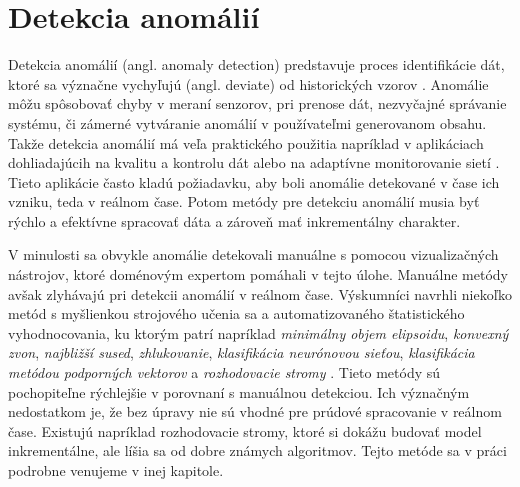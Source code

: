 \section{Detekcia anomálií}
Detekcia anomálií (angl. anomaly detection) predstavuje proces identifikácie dát, ktoré sa význačne vychyľujú (angl. deviate) od historických vzorov \citep{hodge2004survey}. Anomálie môžu spôsobovať chyby v meraní senzorov, pri prenose dát, nezvyčajné správanie systému, či zámerné vytváranie anomálií v používateľmi generovanom obsahu. 
Takže detekcia anomálií má veľa praktického použitia napríklad v aplikáciach dohliadajúcih na kvalitu a kontrolu dát \citep{hill2007real} alebo na adaptívne monitorovanie sietí \citep{hill2010anomaly}. Tieto aplikácie často kladú požiadavku, aby boli anomálie detekované v čase ich vzniku, teda v reálnom čase. Potom metódy pre detekciu anomálií musia byť rýchlo a efektívne spracovať dáta a zároveň mať inkrementálny charakter.
\par
V minulosti sa obvykle anomálie detekovali manuálne s pomocou vizualizačných nástrojov, ktoré doménovým expertom pomáhali v tejto úlohe. Manuálne metódy avšak zlyhávajú pri detekcii anomálií v reálnom čase. Výskumníci navrhli niekoľko metód s myšlienkou strojového učenia sa a automatizovaného štatistického vyhodnocovania, ku ktorým patrí napríklad \textit{minimálny objem elipsoidu}, \textit{konvexný zvon}, \textit{najbližší sused}, \textit{zhlukovanie}, \textit{klasifikácia neurónovou sieťou}, \textit{klasifikácia metódou podporných vektorov} a \textit{rozhodovacie stromy} \citep{hill2010anomaly}. Tieto metódy sú pochopiteľne rýchlejšie v porovnaní s manuálnou detekciou. Ich význačným nedostatkom je, že bez úpravy nie sú vhodné pre prúdové spracovanie v reálnom čase. Existujú napríklad rozhodovacie stromy, ktoré si dokážu budovať model inkrementálne, ale líšia sa od dobre známych algoritmov. Tejto metóde sa v práci podrobne venujeme v inej kapitole.


